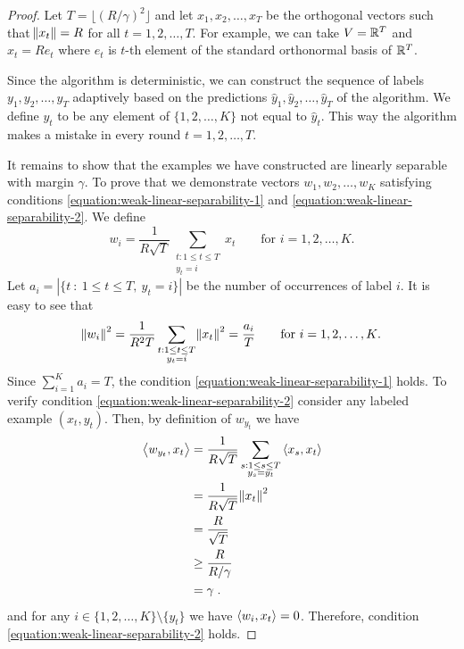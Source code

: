 \begin{proof}
Let $T = \lfloor (R/\gamma)^2 \rfloor$ and let $x_1, x_2, \dots, x_T$ be the
orthogonal vectors such that $\norm{x_t} = R$ for all $t=1,2,\dots,T$. For
example, we can take $V = \mathbb{R}^T$ and $x_t = R e_t$ where $e_t$ is $t$-th element
of the standard orthonormal basis of $\mathbb{R}^T$.

Since the algorithm is deterministic, we can construct the sequence of labels
$y_1, y_2, \dots, y_T$ adaptively based on the predictions $\widehat y_1,
\widehat y_2, \dots, \widehat y_T$ of the algorithm. We define $y_t$ to be any
element of $\{1,2,\dots,K\}$ not equal to $\widehat y_t$. This way the algorithm
makes a mistake in every round $t=1,2,\dots,T$.

It remains to show that the examples we have constructed are linearly separable
with margin $\gamma$. To prove that we demonstrate vectors $w_1, w_2, \dots, w_K$
satisfying conditions \eqref{equation:weak-linear-separability-1} and
\eqref{equation:weak-linear-separability-2}. We define
$$
w_i = \frac{1}{R\sqrt{T}} \sum_{\substack{t : 1 \le t \le T \\ y_t = i}} x_t \qquad \text{for $i=1,2,\dots,K$.}
$$
Let $a_i = |\{ t ~:~ 1 \le t \le T, \ y_t = i \}|$ be the number of occurrences of label $i$.
It is easy to see that
$$
\norm{w_i}^2 = \frac{1}{R^2 T} \sum_{\substack{t : 1 \le t \le T \\ y_t = i}} \norm{x_t}^2 = \frac{a_i}{T} \qquad \text{for $i=1,2,\dots,K$.}
$$
Since $\sum_{i=1}^K a_i = T$, the condition
\eqref{equation:weak-linear-separability-1} holds. To verify condition
\eqref{equation:weak-linear-separability-2} consider any labeled example $(x_t,
y_t)$. Then, by definition of $w_{y_t}$ we have
\begin{align*}
\left\langle w_{y_t}, x_t \right\rangle
& = \frac{1}{R\sqrt{T}} \sum_{\substack{s : 1 \le s \le T \\ y_s = y_t}} \left\langle x_s, x_t \right\rangle \\
& = \frac{1}{R\sqrt{T}} \norm{x_t}^2 \\
& = \frac{R}{\sqrt{T}} \\
& \ge \frac{R}{R/\gamma} \\
& = \gamma \; .
\end{align*}
and for any $i \in \{1,2,\dots,K\} \setminus \{y_t\}$ we have
$\left\langle w_i, x_t \right\rangle = 0$. Therefore, condition \eqref{equation:weak-linear-separability-2} holds.
\end{proof}
